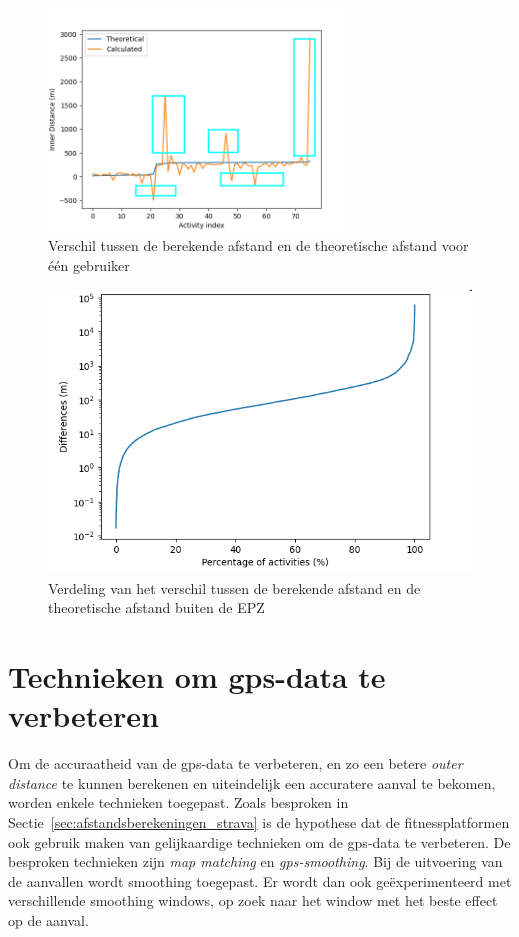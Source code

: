 \begin{figure}[h]
    \centering
    \includegraphics[width=0.7\textwidth]{fig/Afwijkingen&Analyses/Graphs/Verschil_Theoretische_innerDistance.png}
    \caption{Verschil tussen de berekende afstand en de theoretische afstand voor één gebruiker}\label{fig:difference_noCDF}
\end{figure}
\begin{figure}[h]
    \centering
    \includegraphics[width=\textwidth]{fig/Afwijkingen&Analyses/Graphs/100_Differences_tov_theoretische_BefSmoothening.png}
    \caption{Verdeling van het verschil tussen de berekende afstand en de theoretische afstand buiten de \ac{EPZ} }\label{fig:differences_theoretical}
\end{figure}

\section{Technieken om gps-data te verbeteren}
Om de accuraatheid van de \ac{gps}-data te verbeteren, en zo een betere
\textit{outer distance} te kunnen berekenen en uiteindelijk een accuratere
aanval te bekomen, worden enkele technieken toegepast. Zoals besproken in
Sectie~\ref{sec:afstandsberekeningen_strava} is de hypothese dat de
fitnessplatformen ook gebruik maken van gelijkaardige technieken om de
\ac{gps}-data te verbeteren. De besproken technieken zijn \textit{map matching}
en \textit{\ac{gps}-smoothing}. Bij de uitvoering van de aanvallen wordt
smoothing toegepast. Er wordt dan ook geëxperimenteerd met verschillende
smoothing windows, op zoek naar het window met het beste effect op de aanval.

